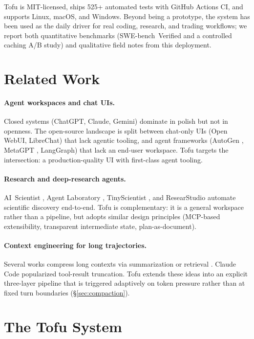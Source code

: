 \documentclass[11pt]{article}
\begin{document}
Tofu is MIT-licensed, ships 525+ automated tests with GitHub Actions CI,
and supports Linux, macOS, and Windows. Beyond being a prototype, the
system has been used as the daily driver for real coding, research, and
trading workflows; we report both quantitative benchmarks
(SWE-bench~Verified and a controlled caching A/B study) and qualitative
field notes from this deployment.

\section{Related Work}

\paragraph{Agent workspaces and chat UIs.}
Closed systems (ChatGPT, Claude, Gemini) dominate in polish but not in
openness. The open-source landscape is split between chat-only UIs (Open
WebUI, LibreChat) that lack agentic tooling, and agent frameworks
(AutoGen \citep{wu2023autogen}, MetaGPT \citep{hong2024metagpt}, LangGraph)
that lack an end-user workspace. Tofu targets the intersection: a
production-quality UI with first-class agent tooling.

\paragraph{Research and deep-research agents.}
AI~Scientist \citep{lu2024aiscientist}, Agent Laboratory
\citep{schmidgall2025agentlab}, TinyScientist \citep{tinyscientist}, and
ResearStudio \citep{ResearStudio} automate scientific discovery end-to-end.
Tofu is complementary: it is a general workspace rather than a pipeline,
but adopts similar design principles (MCP-based extensibility,
transparent intermediate state, plan-as-document).

\paragraph{Context engineering for long trajectories.}
Several works compress long contexts via summarization or retrieval
\citep{chevalier2023autocompressors,jiang2023longllmlingua}. Claude Code
popularized tool-result truncation. Tofu extends these ideas into an
explicit three-layer pipeline that is triggered adaptively on token
pressure rather than at fixed turn boundaries (\S\ref{sec:compaction}).

\section{The Tofu System}
\label{sec:system}
\end{document}
